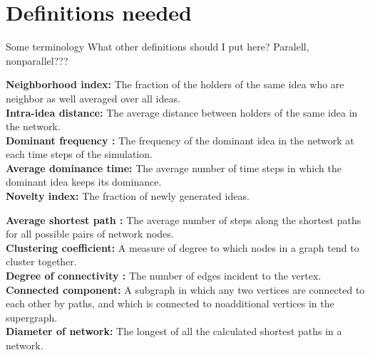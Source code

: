 \documentclass{beamer}
\begin{document}
\section{Definitions needed}
\begin{frame}
{Some terminology}
\alert {What other definitions should I put here? Paralell, nonparallel???}
\end{frame}
%
\begin{frame}
\textbf{Neighborhood index:}  The fraction of the holders of the same idea who are neighbor as well averaged over all ideas.\pause \\
\textbf{Intra-idea distance:} The average distance between holders of the same idea in the network.\pause \\
\textbf{Dominant frequency :} The frequency of the dominant idea in the network at each time steps of the simulation.\pause \\
\textbf{Average dominance time:} The average number of time steps in which the dominant idea keeps its dominance.\pause \\
\textbf{Novelty index:} The fraction of newly generated ideas.\pause 
\end{frame}
%
\begin{frame}
\textbf{Average shortest path :} The average number of steps along the shortest paths for all possible pairs of network nodes.\pause \\
\textbf{Clustering coefficient:} A measure of degree to which nodes in a graph tend to cluster together.\pause \\
\textbf{Degree of connectivity :} The number of edges incident to the vertex.\pause \\
\textbf{Connected component:} A subgraph in which any two vertices are connected to each other by paths, and which is connected to noadditional vertices in the supergraph.\pause \\
\textbf {Diameter of network:} The longest of all the calculated shortest paths in a network.

\end{frame}
%
\end{document}
